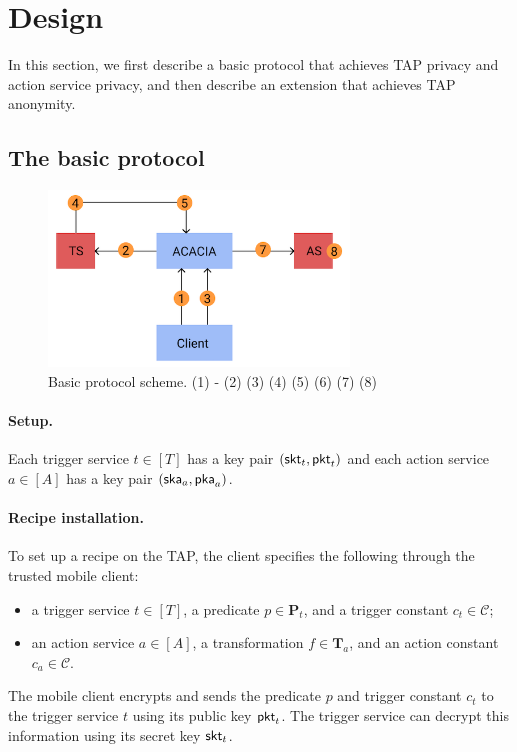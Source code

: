\section{Design}
\label{sec:design}


In this section, we first describe a basic protocol that achieves TAP privacy
and action service privacy, and then describe an extension that achieves TAP
anonymity.

\subsection{The basic protocol}

\begin{figure}
\includegraphics[width=8cm]{graphics/ACACIA.png}
\caption{Basic protocol scheme. (1) - (2) (3) (4) (5) (6) (7) (8)}
\end{figure}

\paragraph{Setup.}
Each trigger service $t \in [T]$ has a key pair $(\mathsf{skt}_t, \mathsf{pkt}_t)$ and each
action service $a \in [A]$ has a key pair $(\mathsf{ska}_a, \mathsf{pka}_a)$.

\paragraph{Recipe installation.}
To set up a recipe on the TAP, the client specifies the following through the
trusted mobile client:
\begin{itemize}
  \item a trigger service $t \in [T]$, a predicate $p \in \mathbf{P}_t$, and a
    trigger constant $c_t \in \mathcal{C}$;
  \item an action service $a \in [A]$, a transformation $f \in \mathbf{T}_a$,
    and an action constant $c_a \in \mathcal{C}$.
\end{itemize}
The mobile client encrypts and sends the predicate $p$ and trigger constant
$c_t$ to the trigger service $t$ using its public key $\mathsf{pkt}_t$. The trigger
service can decrypt this information using its secret key $\mathsf{skt}_t$.

